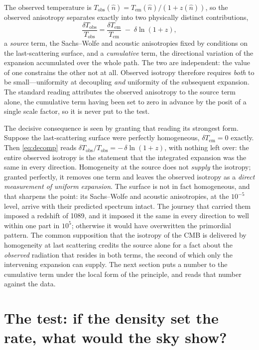 \documentclass[twocolumn]{aastex701}
\begin{document}
The observed temperature is $T_{\mathrm{obs}}(\hat n) = T_{\mathrm{em}}(\hat n)/(1+z(\hat n))$, so the observed anisotropy separates exactly into two physically distinct contributions,
\begin{equation}
\frac{\delta T_{\mathrm{obs}}}{T_{\mathrm{obs}}} = \frac{\delta T_{\mathrm{em}}}{T_{\mathrm{em}}} \;-\; \delta\ln(1+z),
\label{eq:decomp}
\end{equation}
a \emph{source} term, the Sachs--Wolfe and acoustic anisotropies fixed by conditions on the last-scattering surface, and a \emph{cumulative} term, the directional variation of the expansion accumulated over the whole path. The two are independent: the value of one constrains the other not at all. Observed isotropy therefore requires \emph{both} to be small---uniformity at decoupling \emph{and} uniformity of the subsequent expansion. The standard reading attributes the observed anisotropy to the source term alone, the cumulative term having been set to zero in advance by the posit of a single scale factor, so it is never put to the test.

The decisive consequence is seen by granting that reading its strongest form. Suppose the last-scattering surface were perfectly homogeneous, $\delta T_{\mathrm{em}} = 0$ exactly. Then \eqref{eq:decomp} reads $\delta T_{\mathrm{obs}}/T_{\mathrm{obs}} = -\,\delta\ln(1+z)$, with nothing left over: the entire observed isotropy is the statement that the integrated expansion was the same in every direction. Homogeneity at the source does not \emph{supply} the isotropy; granted perfectly, it removes one term and leaves the observed isotropy as a \emph{direct measurement of uniform expansion}. The surface is not in fact homogeneous, and that sharpens the point: its Sachs--Wolfe and acoustic anisotropies, at the $10^{-5}$ level, arrive with their predicted spectrum intact. The journey that carried them imposed a redshift of 1089, and it imposed it the same in every direction to well within one part in $10^{5}$; otherwise it would have overwritten the primordial pattern. The common supposition that the isotropy of the CMB is delivered by homogeneity at last scattering credits the source alone for a fact about the \emph{observed} radiation that resides in both terms, the second of which only the intervening expansion can supply. The next section puts a number to the cumulative term under the local form of the principle, and reads that number against the data.

\section{The test: if the density set the rate, what would the sky show?}\label{sec:floor}
\end{document}
